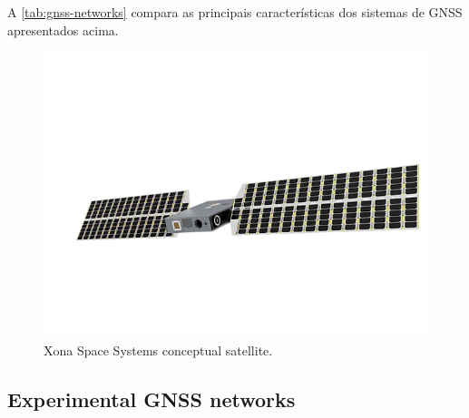 A \autoref{tab:gnss-networks} compara as principais características dos sistemas de GNSS apresentados acima.


\cite{aarestad2020}

\begin{figure}[!ht]
    \begin{center}
        \includegraphics[width=\columnwidth]{figures/xona-satellite}
        \caption{Xona Space Systems conceptual satellite.}
        \label{fig:xona-satellite}
    \end{center}
\end{figure}

\subsection{Experimental GNSS networks}
